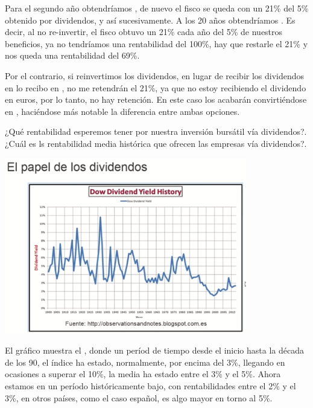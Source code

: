 Para el segundo año obtendríamos , de nuevo el fisco se queda con un 21\% del 5\% obtenido por dividendos, y así sucesivamente. A los 20 años obtendríamos . Es decir, al no re-invertir, el fisco obtuvo un 21\% cada año del 5\% de nuestros beneficios, ya no tendríamos una rentabilidad del 100\%, hay que restarle el 21\% y nos queda una rentabilidad del 69\%.

Por el contrario, si reinvertimos los dividendos, en lugar de recibir los dividendos en  lo recibo en , no me retendrán el 21\%, ya que no estoy recibiendo el dividendo en euros, por lo tanto, no hay retención. En este caso los  acabarán convirtiéndose en , haciéndose más notable la diferencia entre ambas opciones.

¿Qué rentabilidad esperemos tener por nuestra inversión bursátil vía dividendos?.¿Cuál es ls rentabilidad media histórica que ofrecen las empresas vía dividendos?.

\begin{center}
    \includegraphics[scale=.70]{images/dividendos-historico.png}
\end{center}
El gráfico muestra el , donde un períod de tiempo desde el inicio hasta la década de los 90, el índice ha estado, normalmente, por encima del 3\%, llegando en ocasiones a superar el 10\%, la media ha estado entre el 3\% y el 5\%. Ahora estamos en un período históricamente bajo, con rentabilidades entre el 2\% y el 3\%, en otros países, como el caso español, es algo mayor en torno al 5\%.

